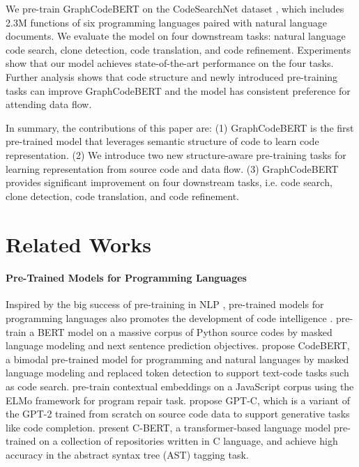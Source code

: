 \documentclass{article} \usepackage{iclr2021_conference,times}
\begin{document}
We pre-train GraphCodeBERT on the CodeSearchNet dataset \citep{husain2019codesearchnet}, which includes 2.3M functions of six programming languages paired with natural language documents. We evaluate the model on four downstream tasks: natural language code search, clone detection, code translation, and code refinement. Experiments show that our model achieves state-of-the-art performance on the four tasks.
Further analysis shows that code structure and newly introduced  pre-training tasks can improve GraphCodeBERT and the model has consistent preference for attending data flow.

In summary, the contributions of this paper are: (1) GraphCodeBERT is the first pre-trained model that leverages semantic structure of code to learn code representation. (2) We introduce two new structure-aware pre-training tasks for learning representation from source code and data flow. (3) GraphCodeBERT provides significant improvement on four downstream tasks, i.e. code search, clone detection, code translation, and code refinement.






\section{Related Works}




\paragraph{Pre-Trained Models for Programming Languages}
Inspired by the big success of pre-training in NLP \citep{devlin2018bert,yang2019xlnet,liu2019roberta,raffel2019exploring},  pre-trained models for programming languages also promotes the development of code intelligence \citep{kanade2019pre,feng2020codebert,karampatsis2020scelmo,svyatkovskiy2020intellicode,buratti2020exploring}. \citet{kanade2019pre} pre-train a BERT model on a massive corpus of Python source codes by masked language modeling and next sentence prediction objectives. \citet{feng2020codebert} propose CodeBERT, a bimodal pre-trained model for programming and natural languages by masked language modeling and replaced token detection to support text-code tasks such as code search. \citet{karampatsis2020scelmo} pre-train contextual embeddings on a JavaScript corpus using the ELMo framework for program repair task. \citet{svyatkovskiy2020intellicode} propose GPT-C, which is a variant of the GPT-2 trained from scratch on source code data to support generative tasks like code completion. 
\citet{buratti2020exploring} present C-BERT, a transformer-based language model pre-trained on a collection of repositories written in C language, and achieve high accuracy in the abstract syntax tree (AST) tagging task. 
\end{document}
